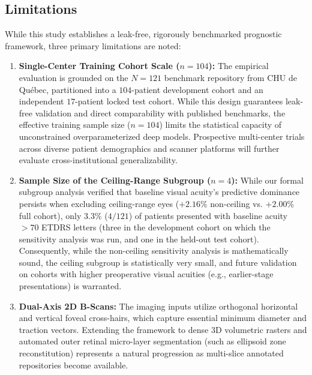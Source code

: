 \documentclass[preprint,12pt]{elsarticle}
\begin{document}
\subsection{Limitations}
While this study establishes a leak-free, rigorously benchmarked prognostic framework, three primary limitations are noted:
\begin{enumerate}
    \item \textbf{Single-Center Training Cohort Scale ($n=104$):} The empirical evaluation is grounded on the $N=121$ benchmark repository from CHU de Qu\'{e}bec, partitioned into a $104$-patient development cohort and an independent $17$-patient locked test cohort. While this design guarantees leak-free validation and direct comparability with published benchmarks, the effective training sample size ($n=104$) limits the statistical capacity of unconstrained overparameterized deep models. Prospective multi-center trials across diverse patient demographics and scanner platforms will further evaluate cross-institutional generalizability.
    \item \textbf{Sample Size of the Ceiling-Range Subgroup ($n=4$):} While our formal subgroup analysis verified that baseline visual acuity's predictive dominance persists when excluding ceiling-range eyes ($+2.16\%$ non-ceiling vs. $+2.00\%$ full cohort), only $3.3\%$ ($4/121$) of patients presented with baseline acuity $>70$ ETDRS letters (three in the development cohort on which the sensitivity analysis was run, and one in the held-out test cohort). Consequently, while the non-ceiling sensitivity analysis is mathematically sound, the ceiling subgroup is statistically very small, and future validation on cohorts with higher preoperative visual acuities (e.g., earlier-stage presentations) is warranted.
    \item \textbf{Dual-Axis 2D B-Scans:} The imaging inputs utilize orthogonal horizontal and vertical foveal cross-hairs, which capture essential minimum diameter and traction vectors. Extending the framework to dense 3D volumetric rasters and automated outer retinal micro-layer segmentation (such as ellipsoid zone reconstitution) represents a natural progression as multi-slice annotated repositories become available.
\end{enumerate}
\end{document}
